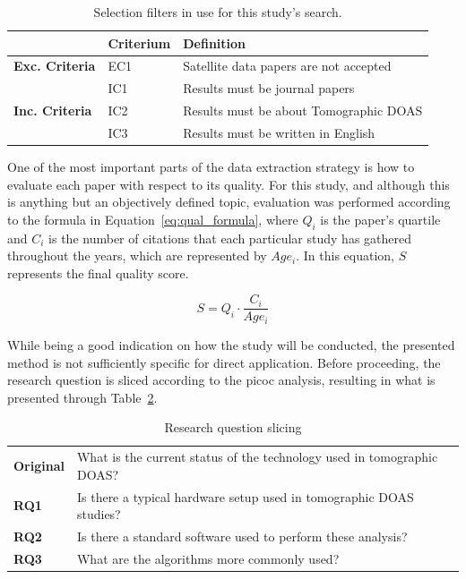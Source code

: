 \begin{table}[htb]
\centering
\caption{Selection filters in use for this study's search.}
\label{tab:inx_exc_criteria}
\begin{tabularx}{\textwidth}{lXl}%
\toprule
\multicolumn{1}{l}{} & \textbf{Criterium} & \textbf{Definition} \\ \midrule
\multirow{1}{*}{\textbf{Exc. Criteria}} & EC1 & Satellite data papers
are not accepted \\
\midrule
\multicolumn{1}{l}{\multirow{3}{*}{\textbf{Inc. Criteria}}} & IC1 &
Results must be journal papers \\
\multicolumn{1}{l}{} & IC2 & Results must be about Tomographic DOAS \\ 
\multicolumn{1}{l}{} & IC3 & Results must be written in English \\
\bottomrule
\end{tabularx}
\end{table}

One of the most important parts of the data extraction strategy is how
to evaluate each paper with respect to its quality. For this study, and
although this is anything but an objectively defined topic, evaluation
was performed according to the formula in
Equation~\ref{eq:qual_formula}, where $Q_i$ is the paper's quartile and
$C_i$ is the number of citations that each particular study has gathered
throughout the years, which are represented by $Age_i$. In this
equation, $S$ represents the final quality score.

\begin{equation}
    \label{eq:qual_formula}
    S = Q_{i} \cdot \frac{C_i}{Age_i}
\end{equation}

While being a good indication on how the study will be conducted, the
presented method is not sufficiently specific for direct application.
Before proceeding, the research question is sliced according to the
\gls{picoc} analysis, resulting in what is presented through
Table~\ref{tab:rq_slicing_sms}.

\begin{table}[htb]
\centering
\small
\caption{Research question slicing}
\label{tab:rq_slicing_sms}
    \begin{tabularx}{\textwidth}{lX}
        \toprule
        \textbf{Original} & What is the current status of the technology used in
        tomographic DOAS? \\
        \textbf{RQ1} & Is there a typical hardware setup used in tomographic
        DOAS studies? \\
        \textbf{RQ2} & Is there a standard software used to perform these
        analysis? \\
        \textbf{RQ3} & What are the algorithms more commonly used?\\\bottomrule
    \end{tabularx}
\end{table}

